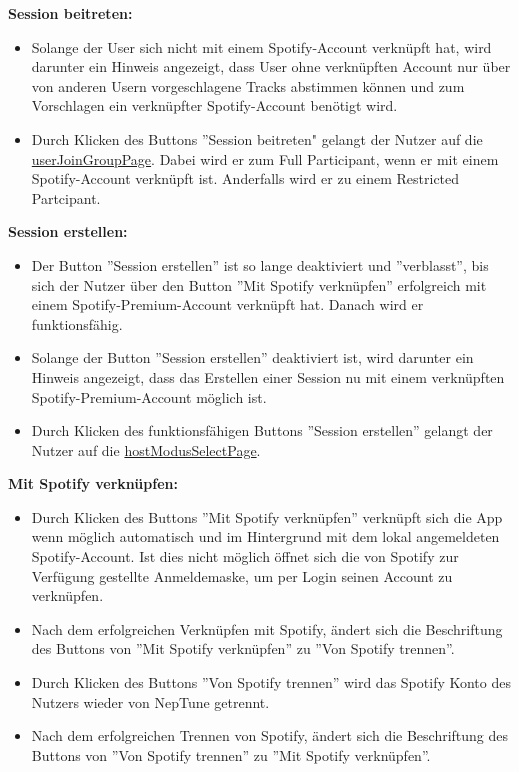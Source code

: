 \documentclass[oneside, ngerman]{sdqtechreport}
\begin{document}
\newpage
\textbf{Session beitreten:}
\begin{itemize}
    \item Solange der User sich nicht mit einem Spotify-Account verknüpft hat, wird darunter ein Hinweis angezeigt, dass User ohne verknüpften Account nur über von anderen Usern vorgeschlagene Tracks abstimmen können und zum Vorschlagen ein verknüpfter Spotify-Account benötigt wird.
    \item Durch Klicken des Buttons ''Session beitreten" gelangt der Nutzer auf die \hyperlink{userJoinGroupPage}{userJoinGroupPage}. Dabei wird er zum Full Participant, wenn er mit einem Spotify-Account verknüpft ist. Anderfalls wird er zu einem Restricted Partcipant.
\end{itemize}

\textbf{Session erstellen:}
\begin{itemize}
    \item Der Button ''Session erstellen'' ist so lange deaktiviert und ''verblasst'', bis sich der Nutzer über den Button ''Mit Spotify verknüpfen'' erfolgreich mit einem Spotify-Premium-Account verknüpft hat. Danach wird er funktionsfähig.
    \item Solange der Button ''Session erstellen'' deaktiviert ist, wird darunter ein Hinweis angezeigt, dass das Erstellen einer Session nu mit einem verknüpften Spotify-Premium-Account möglich ist.
    \item Durch Klicken des funktionsfähigen Buttons ''Session erstellen'' gelangt der Nutzer auf die \hyperlink{hostModusSelectPage}{hostModusSelectPage}.
\end{itemize}

\textbf{Mit Spotify verknüpfen:}
\begin{itemize}
    \item Durch Klicken des Buttons ''Mit Spotify verknüpfen'' verknüpft sich die App wenn möglich automatisch und im Hintergrund mit dem lokal angemeldeten Spotify-Account. Ist dies nicht möglich öffnet sich die von Spotify zur Verfügung gestellte Anmeldemaske, um per Login seinen Account zu verknüpfen.
    \item Nach dem erfolgreichen Verknüpfen mit Spotify, ändert sich die Beschriftung des Buttons von ''Mit Spotify verknüpfen'' zu ''Von Spotify trennen''.
    \item Durch Klicken des Buttons ''Von Spotify trennen'' wird das Spotify Konto des Nutzers wieder von NepTune getrennt.
    \item Nach dem erfolgreichen Trennen von Spotify, ändert sich die Beschriftung des Buttons von ''Von Spotify trennen'' zu ''Mit Spotify verknüpfen''.
\end{itemize}
\end{document}
